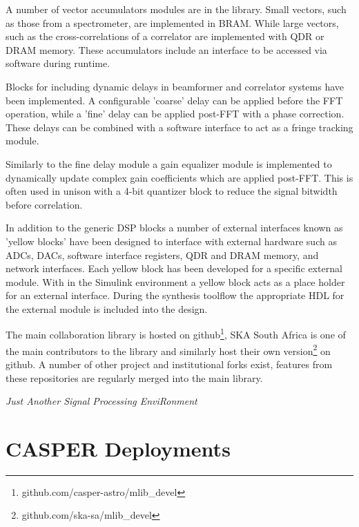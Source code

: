 \documentclass{ws-jai}
\begin{document}
A number of vector accumulators modules are in the library.
Small vectors, such as those from a spectrometer, are implemented in BRAM. While
large vectors, such as the cross-correlations of a correlator are implemented
with QDR or DRAM memory. These accumulators include an interface to be accessed
via software during runtime.

Blocks for including dynamic delays in beamformer and correlator systems have
been implemented. A configurable 'coarse' delay can be applied before the FFT
operation, while a 'fine' delay can be applied post-FFT with a phase correction.
These delays can be combined with a software interface to act as a fringe
tracking module.

Similarly to the fine delay module a gain equalizer module is implemented to
dynamically update complex gain coefficients which are applied post-FFT. This is
often used in unison with a 4-bit quantizer block to reduce the signal bitwidth
before correlation.

In addition to the generic DSP blocks a number of external interfaces known as
'yellow blocks' have been designed to interface with external hardware such as
ADCs, DACs, software interface registers, QDR  and DRAM memory, and network
interfaces. Each yellow block has been developed for a specific external module.
With in the Simulink environment a yellow block acts as a place holder for an
external interface. During the synthesis toolflow the appropriate HDL for the
external module is included into the design.

The main collaboration library is hosted on
github\footnote{github.com/casper-astro/mlib\_devel}, SKA South Africa
is one of the main contributors to the library and similarly host their own
version\footnote{github.com/ska-sa/mlib\_devel} on github. A number of
other project and institutional forks exist, features from these repositories
are regularly merged into the main library.

\emph{Just Another Signal Processing EnviRonment}


\section{CASPER Deployments} \label{sec:Deployments}
\end{document}
